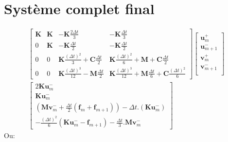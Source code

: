 \documentclass[12pt,a4paper]{report}
\begin{document}
\section{Système complet final}

\begin{equation}
\begin{array}{c}
		\begin{bmatrix}   
		   		\mathbf{K}
			&
		   		\mathbf{K}
		   	&
			   	-\mathbf{K} \frac{2\Delta t}{3} 
		   	&
		   		-\mathbf{K} \frac{\Delta t}{3} 
		\\ 	     
			   0 
			&
				\mathbf{K} 
		   	&
		   		-\mathbf{K} \frac{\Delta t}{2} 
		   	&
		   		-\mathbf{K} \frac{\Delta t}{2}
		\\   
		   		0
		   	& 
		   		0
		   	&
			   	\mathbf{K}
			   		\frac{(\Delta t)^2}{3} 
		   		+\mathbf{C} \frac{\Delta t}{2}
		   	&
		   		\mathbf{K} \frac{(\Delta t)^2}{6} 
		   		+\mathbf{M} 
			   	+\mathbf{C} \frac{\Delta t}{2}
		\\    
		   		0
		   	&
		   		0
		   	&
		   		\mathbf{K} \frac{(\Delta t)^3}{12}
		   		-\mathbf{M}
			   		\frac{\Delta t}{2} 
		   	&
		   		\mathbf{K} \frac{(\Delta t)^3}{12}
		   		+\mathbf{M} \frac{\Delta t}{6} 
			   +\mathbf{C} \frac{(\Delta t)^2}{6} 
	\end{bmatrix}
	\begin{bmatrix}
		   \mathbf{u}_m^+  		\\
		   \mathbf{u}_{m+1}^-  	\\
		   \mathbf{v}_m^+  		\\
		   \mathbf{v}_{m+1}^-  	\\
	\end{bmatrix}
	\\
	\begin{bmatrix}	
		  		2 \mathbf{K} \mathbf{u}_m^-
		\\ \mathbf{K} \mathbf{u}_m^-
		\\ 	\left( \mathbf{M} \mathbf{v}_m^-
		     			+\frac{\Delta t}{2}  (\mathbf{f}_m + \mathbf{f}_{m+1})
			  \right)
			-\Delta t.
			 \left( \mathbf{K} \mathbf{u}_m^-
			  \right)
		\\ -\frac{(\Delta t)^2}{6}
				\left( \mathbf{K} \mathbf{u}_m^- 
						-\mathbf{f}_{m+1}
				\right)
					  
			- \frac{\Delta t}{3} .  \mathbf{M} \mathbf{v}_m^-
	\end{bmatrix}
\end{array}
\end{equation}
Ou:
\end{document}
